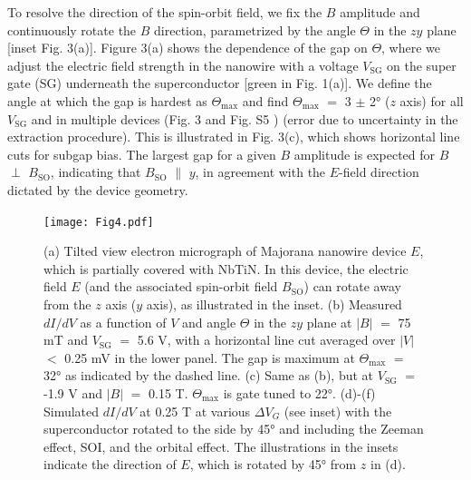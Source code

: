 To resolve the direction of the spin-orbit field, we fix the $B$ amplitude and continuously rotate the $B$ direction, parametrized by the angle $\Theta$ in the $zy$ plane [inset Fig. 3(a)].
Figure 3(a) shows the dependence of the gap on $\Theta$, where we adjust the electric field strength in the nanowire with a voltage $V_{\mathrm{SG}}$ on the super gate (SG) underneath the superconductor [green in Fig. 1(a)].
We define the angle at which the gap is hardest as $\Theta_{\mathrm{max}}$ and find $\Theta_{\mathrm{max}}$ $=$ 3 $\pm$ \ang{2} ($z$ axis) for all $V_{\mathrm{SG}}$ and in multiple devices (Fig. 3 and Fig. S5 \cite{Note1}) (error due to uncertainty in the extraction procedure).
This is illustrated in Fig. 3(c), which shows horizontal line cuts for subgap bias.
The largest gap for a given $B$ amplitude is expected for $B$ $\perp$ $B_{\mathrm{SO}}$, indicating that $B_{\mathrm{SO}}$ $\parallel$ $y$, in agreement with the $E$-field direction dictated by the device geometry.

\begin{figure}[b]
\texttt{[image: Fig4.pdf]}
\caption{\label{fig4}
(a) Tilted view electron micrograph of Majorana nanowire device $E$, which is partially covered with NbTiN.
In this device, the electric field $E$ (and the associated spin-orbit field $B_{\mathrm{SO}}$) can rotate away from the $z$ axis ($y$ axis), as illustrated in the inset.
(b) Measured $dI/dV$ as a function of $V$ and angle $\Theta$ in the $zy$ plane at $|B|$ $=$ 75 mT and $V_{\mathrm{SG}}$ $=$ 5.6 V, with a horizontal line cut averaged over $|V|$ $<$ 0.25 mV in the lower panel.
The gap is maximum at $\Theta_{\mathrm{max}}$ $=$ \ang{32} as indicated by the dashed line.
(c) Same as (b), but at $V_{\mathrm{SG}}$ $=$ -1.9 V and $|B|$ $=$ 0.15 T.
$\Theta_{\mathrm{max}}$ is gate tuned to \ang{22}.
(d)-(f) Simulated $dI/dV$ at 0.25 T at various $\Delta V_G$ (see inset) with the superconductor rotated to the side by \ang{45} and including the Zeeman effect, SOI, and the orbital effect.
The illustrations in the insets indicate the direction of $E$, which is rotated by \ang{45} from $z$ in (d).
}
\end{figure}

